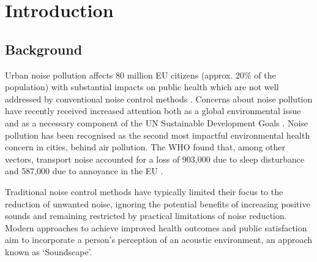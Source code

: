 \chapter{Introduction}
\label{ch:intro}



\section{Background}

Urban noise pollution affects 80 million EU citizens (approx. 20\% of the population) with substantial impacts on public health which are not well addressed by conventional noise control methods \citep{EEA2020Environmental}. Concerns about noise pollution have recently received increased attention both as a global environmental issue \citep{Aletta2022Frontiers} and as a necessary component of the UN Sustainable Development Goals \citep{King2022Here}. Noise pollution has been recognised as the second most impactful environmental health concern in cities, behind air pollution. The WHO found that, among other vectors, transport noise accounted for a loss of 903,000  due to sleep disturbance and 587,000  due to annoyance in the EU \citep{CDC2011Burden}.

Traditional noise control methods have typically limited their focus to the reduction of unwanted noise, ignoring the potential benefits of increasing positive sounds and remaining restricted by practical limitations of noise reduction. Modern approaches to achieve improved health outcomes and public satisfaction aim to incorporate a person's perception of an acoustic environment, an approach known as `Soundscape'.

